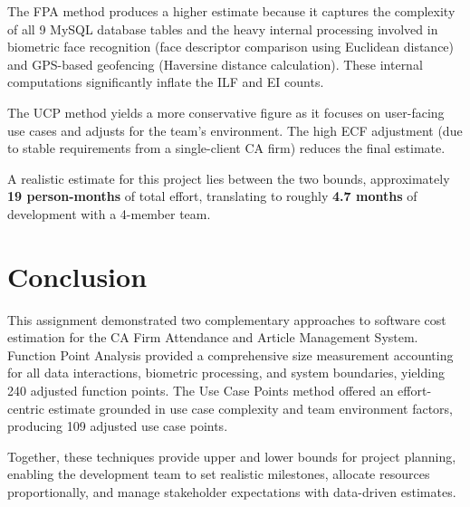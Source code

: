 \documentclass[12pt,a4paper]{article}
\begin{document}
\medskip
\noindent The FPA method produces a higher estimate because it captures the complexity of all 9 MySQL database tables and the heavy internal processing involved in biometric face recognition (face descriptor comparison using Euclidean distance) and GPS-based geofencing (Haversine distance calculation). These internal computations significantly inflate the ILF and EI counts.

\noindent The UCP method yields a more conservative figure as it focuses on user-facing use cases and adjusts for the team's environment. The high ECF adjustment (due to stable requirements from a single-client CA firm) reduces the final estimate.

\noindent A realistic estimate for this project lies between the two bounds, approximately \textbf{19 person-months} of total effort, translating to roughly \textbf{4.7 months} of development with a 4-member team.

\section{Conclusion}
This assignment demonstrated two complementary approaches to software cost estimation for the CA Firm Attendance and Article Management System. Function Point Analysis provided a comprehensive size measurement accounting for all data interactions, biometric processing, and system boundaries, yielding 240 adjusted function points. The Use Case Points method offered an effort-centric estimate grounded in use case complexity and team environment factors, producing 109 adjusted use case points.

Together, these techniques provide upper and lower bounds for project planning, enabling the development team to set realistic milestones, allocate resources proportionally, and manage stakeholder expectations with data-driven estimates.
\end{document}
